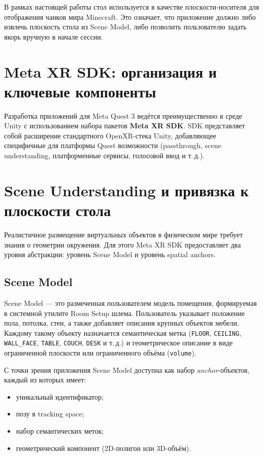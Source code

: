 \documentclass[a4paper,12pt]{article}
\begin{document}
В рамках настоящей работы стол используется в качестве плоскости-носителя для отображения чанков мира Minecraft. Это означает, что приложение должно либо извлечь плоскость стола из Scene Model, либо позволить пользователю задать якорь вручную в начале сессии.



\section*{Meta XR SDK: организация и ключевые компоненты}

Разработка приложений для Meta Quest 3 ведётся преимущественно в среде Unity с использованием набора пакетов \textbf{Meta XR SDK}. SDK представляет собой расширение стандартного OpenXR-стека Unity, добавляющее специфичные для платформы Quest возможности (passthrough, scene understanding, платформенные сервисы, голосовой ввод и т.\,д.).



\section*{Scene Understanding и привязка к плоскости стола}

Реалистичное размещение виртуальных объектов в физическом мире требует знания о геометрии окружения. Для этого Meta XR SDK предоставляет два уровня абстракции: уровень Scene Model и уровень spatial anchors.

\subsection*{Scene Model}

Scene Model --- это размеченная пользователем модель помещения, формируемая в системной утилите Room Setup шлема. Пользователь указывает положение пола, потолка, стен, а также добавляет описания крупных объектов мебели. Каждому такому объекту назначается семантическая метка (\texttt{FLOOR}, \texttt{CEILING}, \texttt{WALL\_FACE}, \texttt{TABLE}, \texttt{COUCH}, \texttt{DESK} и т.\,д.) и геометрическое описание в виде ограниченной плоскости или ограниченного объёма (\texttt{volume}).

С точки зрения приложения Scene Model доступна как набор \textit{anchor}-объектов, каждый из которых имеет:

\begin{itemize}
    \item уникальный идентификатор;
    \item позу в tracking space;
    \item набор семантических меток;
    \item геометрический компонент (2D-полигон или 3D-объём).
\end{itemize}
\end{document}
